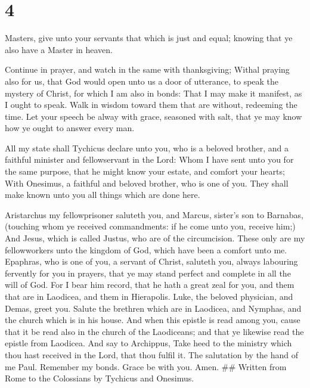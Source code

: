 \hypertarget{section-3}{%
\section{4}\label{section-3}}

 Masters, give unto your servants that which is just and
equal; knowing that ye also have a Master in heaven.

 Continue in prayer, and watch in the same with
thanksgiving;  Withal praying also for us, that God would
open unto us a door of utterance, to speak the mystery of Christ, for
which I am also in bonds:  That I may make it manifest, as
I ought to speak.  Walk in wisdom toward them that are
without, redeeming the time.  Let your speech be alway
with grace, seasoned with salt, that ye may know how ye ought to answer
every man.

 All my state shall Tychicus declare unto you, who is a
beloved brother, and a faithful minister and fellowservant in the Lord:
 Whom I have sent unto you for the same purpose, that he
might know your estate, and comfort your hearts;  With
Onesimus, a faithful and beloved brother, who is one of you. They shall
make known unto you all things which are done here.

 Aristarchus my fellowprisoner saluteth you, and Marcus,
sister's son to Barnabas, (touching whom ye received commandments: if he
come unto you, receive him;)  And Jesus, which is called
Justus, who are of the circumcision. These only are my fellowworkers
unto the kingdom of God, which have been a comfort unto me.
 Epaphras, who is one of you, a servant of Christ,
saluteth you, always labouring fervently for you in prayers, that ye may
stand perfect and complete in all the will of God.  For I
bear him record, that he hath a great zeal for you, and them that are in
Laodicea, and them in Hierapolis.  Luke, the beloved
physician, and Demas, greet you.  Salute the brethren
which are in Laodicea, and Nymphas, and the church which is in his
house.  And when this epistle is read among you, cause
that it be read also in the church of the Laodiceans; and that ye
likewise read the epistle from Laodicea.  And say to
Archippus, Take heed to the ministry which thou hast received in the
Lord, that thou fulfil it.  The salutation by the hand of
me Paul. Remember my bonds. Grace be with you. Amen. \#\# Written from
Rome to the Colossians by Tychicus and Onesimus.

